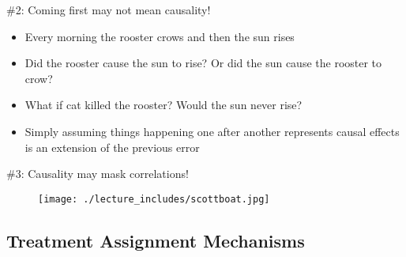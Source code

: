 \documentclass{beamer}
\begin{document}
\begin{frame}{\#2: Coming first may not mean causality!}

  \begin{itemize}
    \item Every morning the rooster crows and then the sun rises
    \item Did the rooster cause the sun to rise? Or did the sun cause the rooster to crow?
    \item What if cat killed the rooster?  Would the sun never rise?
    \item Simply assuming things happening one after another represents causal effects is an extension of the previous error
  \end{itemize}

\end{frame}

\begin{frame}{\#3: Causality may mask correlations!}

  \begin{figure}
    \centering
    \texttt{[image: ./lecture\_includes/scottboat.jpg]}
  \end{figure}

\end{frame}

\subsection{Treatment Assignment Mechanisms}





\end{document}
